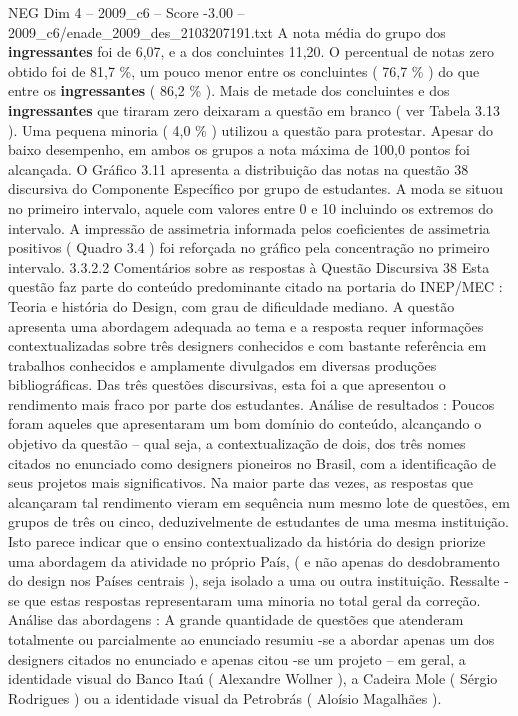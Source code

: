 \begin{textsample}{NEG Dim 4 – 2009\_c6 – Score -3.00 – 2009\_c6/enade\_2009\_des\_2103207191.txt}
A nota média do grupo dos \textbf{ingressantes} foi de 6,07, e a dos concluintes 11,20.
O percentual de notas zero obtido foi de 81,7 \%, um pouco menor entre os concluintes ( 76,7 \% ) do que entre os \textbf{ingressantes} ( 86,2 \% ).
Mais de metade dos concluintes e dos \textbf{ingressantes} que tiraram zero deixaram a questão em branco ( ver Tabela 3.13 ).
Uma pequena minoria ( 4,0 \% ) utilizou a questão para protestar.
Apesar do baixo desempenho, em ambos os grupos a nota máxima de 100,0 pontos foi alcançada.
O Gráfico 3.11 apresenta a distribuição das notas na questão 38 discursiva do Componente Específico por grupo de estudantes.
A moda se situou no primeiro intervalo, aquele com valores entre 0 e 10 incluindo os extremos do intervalo.
A impressão de assimetria informada pelos coeficientes de assimetria positivos ( Quadro 3.4 ) foi reforçada no gráfico pela concentração no primeiro intervalo. 3.3.2.2 Comentários sobre as respostas à Questão Discursiva 38 Esta questão faz parte do conteúdo predominante citado na portaria do INEP/MEC : Teoria e história do Design, com grau de dificuldade mediano.
A questão apresenta uma abordagem adequada ao tema e a resposta requer informações contextualizadas sobre três designers conhecidos e com bastante referência em trabalhos conhecidos e amplamente divulgados em diversas produções bibliográficas.
Das três questões discursivas, esta foi a que apresentou o rendimento mais fraco por parte dos estudantes.
Análise de resultados : Poucos foram aqueles que apresentaram um bom domínio do conteúdo, alcançando o objetivo da questão – qual seja, a contextualização de dois, dos três nomes citados no enunciado como designers pioneiros no Brasil, com a identificação de seus projetos mais significativos.
Na maior parte das vezes, as respostas que alcançaram tal rendimento vieram em sequência num mesmo lote de questões, em grupos de três ou cinco, deduzivelmente de estudantes de uma mesma instituição.
Isto parece indicar que o ensino contextualizado da história do design priorize uma abordagem da atividade no próprio País, ( e não apenas do desdobramento do design nos Países centrais ), seja isolado a uma ou outra instituição.
Ressalte -se que estas respostas representaram uma minoria no total geral da correção.
Análise das abordagens : A grande quantidade de questões que atenderam totalmente ou parcialmente ao enunciado resumiu -se a abordar apenas um dos designers citados no enunciado e apenas citou -se um projeto – em geral, a identidade visual do Banco Itaú ( Alexandre Wollner ), a Cadeira Mole ( Sérgio Rodrigues ) ou a identidade visual da Petrobrás ( Aloísio Magalhães ).

\end{textsample}
